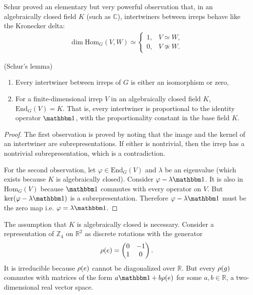 Schur proved an elementary but very powerful observation that, in an algebraically closed field $K$ (such as $\mathbb{C}$), intertwiners between irreps behave like the Kronecker delta:
\begin{align}
\dim \text{Hom}_G (V,W) \simeq
	\begin{cases}
		1, & V \simeq W, \\
		0, & V \not\simeq W.
	\end{cases}
\end{align}
\begin{lemma}\label{lemma:schur}
	{\normalfont (Schur's lemma)}
	\begin{enumerate}
		\item Every intertwiner between irreps of $G$ is either an isomorphism or zero,
		\item For a finite-dimensional irrep $V$ in an algebraically closed field $K$,  $\text{End}_G (V) = K$. That is, every intertwiner is proportional to the identity operator $\id$, with the proportionality constant in the base field $K$.
	\end{enumerate}
\end{lemma}
\begin{proof}
	The first observation is proved by noting that the image and the kernel of an intertwiner are subrepresentations. If either is nontrivial, then the irrep has a nontrivial subrepresentation, which is a contradiction.
	
	For the second observation, let $\varphi \in \text{End}_G (V)$ and $\lambda$ be an eigenvalue (which exists because $K$ is algebraically closed). Consider $\varphi - \lambda \id$. It is also in $\text{Hom}_G (V)$ because $\id$ commutes with every operator on $V$. But $\ker (\varphi - \lambda \id)$ is a subrepresentation. Therefore  $\varphi - \lambda \id$ must be the zero map i.e. $\varphi = \lambda \id$.
\end{proof}
\noindent
The assumption that $K$ is algebraically closed is necessary. Consider a representation of $\mathbb{Z}_4$ on $\mathbb{R}^2$ as discrete rotations with the generator
\begin{align}
\rho(e) = \begin{pmatrix}
0 & -1 \\
1 & 0
\end{pmatrix}.
\end{align}
It is irreducible because $\rho(e)$ cannot be diagonalized over $\mathbb{R}$. But every $\rho(g)$ commutes with matrices of the form $a\id + b\rep(e)$ for some $a,b \in \mathbb{R}$, a two-dimensional real vector space.

